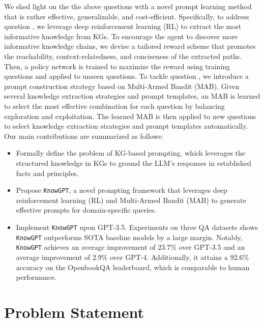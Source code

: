\documentclass{article}
\theoremstyle{boldremark}
\begin{document}
We shed light on the the above questions with a novel prompt learning method that
is rather effective, generalizable, and cost-efficient. Specifically, to address question \textbf{}, we leverage deep reinforcement learning (RL) to extract the most informative knowledge from KGs. To encourage the agent to discover more informative knowledge chains, we devise a tailored reward scheme that promotes the reachability, context-relatedness, and conciseness of the extracted paths. Then, a policy network is trained to maximize the reward using training questions and applied to unseen questions. To tackle question \textbf{}, we introduce a prompt construction strategy based on Multi-Armed Bandit (MAB). Given several knowledge extraction strategies and prompt templates, an MAB is learned to select the most effective combination for each question by balancing exploration and exploitation. The learned MAB is then applied to new questions to select knowledge extraction strategies and prompt templates automatically.
Our main contributions are summarized as follows:
\begin{itemize}[leftmargin=*]
\item Formally define the problem of KG-based prompting, which leverages the structured knowledge in KGs to ground the LLM's responses in established facts and principles.
\item Propose \texttt{KnowGPT}, a novel prompting framework that leverages deep reinforcement learning (RL) and Multi-Armed Bandit (MAB) to generate effective prompts for domain-specific queries.
\item Implement \texttt{KnowGPT} upon GPT-3.5. Experiments on three QA datasets shows \texttt{KnowGPT} outperforms SOTA baseline models by a large margin. 
Notably, \texttt{KnowGPT} achieves an average improvement of 23.7\% over GPT-3.5 and an average improvement of 2.9\% over GPT-4. Additionally, it attains a 92.6\% accuracy on the OpenbookQA leaderboard, which is comparable to human performance.
\end{itemize}


\section{Problem Statement}
\end{document}
